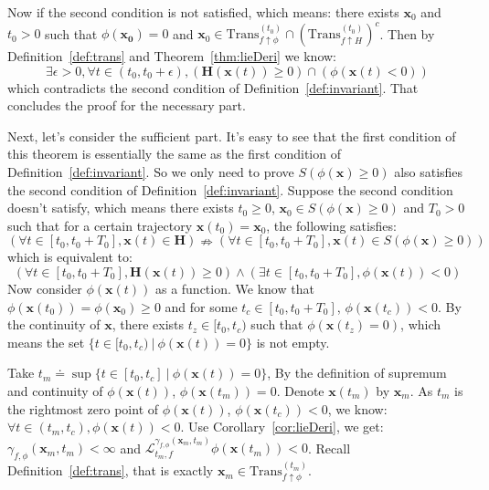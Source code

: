 \documentclass{jssc}
\begin{document}
Now if the second condition is not satisfied, which means: there exists $\boldsymbol{x}_0$ and $t_0 > 0$ such that $\phi(\boldsymbol{x_0}) = 0$ and $\boldsymbol{x}_0 \in \mathrm{Trans}_{f \uparrow \phi}^{(t_0)} \cap (\mathrm{Trans}_{f \uparrow H}^{(t_0)})^c$. Then by Definition~\ref{def:trans} and Theorem~\ref{thm:lieDeri} we know:
\begin{equation*}
		\exists \epsilon > 0, \forall t \in (t_0, t_0 + \epsilon), (\boldsymbol{H}(\boldsymbol{x}(t)) \geq 0) \cap (\phi(\boldsymbol{x}(t) < 0))
\end{equation*}
which contradicts the second condition of Definition~\ref{def:invariant}. That concludes the proof for the necessary part.

Next, let's consider the sufficient part. It's easy to see that the first condition of this theorem is essentially the same as the first condition of Definition~\ref{def:invariant}. So we only need to prove $S(\phi(\boldsymbol{x}) \geq 0)$ also satisfies the second condition of Definition~\ref{def:invariant}. Suppose the second condition doesn't satisfy, which means there exists $t_0 \geq 0$, $\boldsymbol{x}_0 \in S(\phi(\boldsymbol{x}) \geq 0)$ and $T_0 > 0$ such that for a certain trajectory $\boldsymbol{x}(t_0) = \boldsymbol{x}_0$, the following satisfies:
	\begin{equation*}
		(\forall t \in [t_0, t_0 + T_0], \boldsymbol{x}(t) \in \boldsymbol{H}) \nRightarrow (\forall t \in [t_0, t_0 + T_0], \boldsymbol{x}(t) \in S(\phi(\boldsymbol{x}) \geq 0))
	\end{equation*}
which is equivalent to:
	\begin{equation*}
		(\forall t \in [t_0, t_0 + T_0], \boldsymbol{H}(\boldsymbol{x}(t)) \geq 0) \wedge (\exists t \in [t_0, t_0 + T_0], \phi(\boldsymbol{x}(t)) < 0)
	\end{equation*}
Now consider $\phi(\boldsymbol{x}(t))$ as a function. We know that $\phi(\boldsymbol{x}(t_0)) = \phi(\boldsymbol{x}_0) \geq 0$ and for some $t_c \in [t_0, t_0 + T_0]$, $\phi(\boldsymbol{x}(t_c)) < 0$. By the continuity of $\boldsymbol{x}$, there exists $t_z \in [t_0, t_c)$ such that $\phi(\boldsymbol{x}(t_z) = 0)$, which means the set $\{ t \in [t_0, t_c)\ |\ \phi(\boldsymbol{x}(t)) = 0 \}$ is not empty.

Take $t_m \doteq \sup\{t \in [t_0, t_c]\ |\ \phi (\boldsymbol{x}(t)) = 0 \}$, By the definition of supremum and continuity of $\phi(\boldsymbol{x}(t))$, $\phi(\boldsymbol{x}(t_m)) = 0$. Denote $\boldsymbol{x}(t_m)$ by $\boldsymbol{x}_m$. As $t_m$ is the rightmost zero point of $\phi(\boldsymbol{x}(t))$, $\phi(\boldsymbol{x}(t_c)) < 0$, we know: $\forall t \in (t_m, t_c),\phi(\boldsymbol{x}(t)) < 0$. Use Corollary~\ref{cor:lieDeri}, we get:  $\gamma_{f, \phi}(\boldsymbol{x}_m, t_m) < \infty$ and $\mathcal{L}_{t_m, f}^{\gamma_{f, \phi}(\boldsymbol{x}_m, t_m)} \phi (\boldsymbol{x}(t_m)) < 0$. Recall Definition~\ref{def:trans}, that is exactly $\boldsymbol{x}_m \in \mathrm{Trans}_{f \uparrow \phi}^{(t_m)}$.
\end{document}

